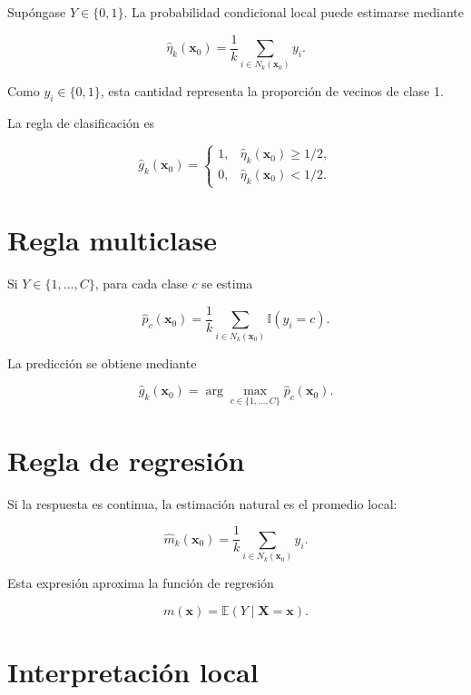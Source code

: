 \documentclass[
  spanish,
  10.5pt,
  letterpaper,
  DIV=11,
  numbers=noendperiod,
  oneside,
  open=any]{scrreprt}
\theoremstyle{definition}
\theoremstyle{definition}
\theoremstyle{plain}
\theoremstyle{remark}
\begin{document}

Supóngase \(Y\in\{0,1\}\). La probabilidad condicional local puede
estimarse mediante

\[
\widehat{\eta}_k(\mathbf{x}_0)
=
\frac{1}{k}
\sum_{i\in N_k(\mathbf{x}_0)} y_i.
\]

Como \(y_i\in\{0,1\}\), esta cantidad representa la proporción de
vecinos de clase 1.

La regla de clasificación es

\[
\widehat{g}_k(\mathbf{x}_0)
=
\begin{cases}
1, & \widehat{\eta}_k(\mathbf{x}_0)\ge 1/2,\\
0, & \widehat{\eta}_k(\mathbf{x}_0)<1/2.
\end{cases}
\]

\section*{Regla multiclase}\label{regla-multiclase}


Si \(Y\in\{1,\ldots,C\}\), para cada clase \(c\) se estima

\[
\widehat{p}_c(\mathbf{x}_0)
=
\frac{1}{k}
\sum_{i\in N_k(\mathbf{x}_0)}
\mathbb{I}(y_i=c).
\]

La predicción se obtiene mediante

\[
\widehat{g}_k(\mathbf{x}_0)
=
\arg\max_{c\in\{1,\ldots,C\}}
\widehat{p}_c(\mathbf{x}_0).
\]

\section*{Regla de regresión}\label{regla-de-regresiuxf3n}


Si la respuesta es continua, la estimación natural es el promedio local:

\[
\widehat{m}_k(\mathbf{x}_0)
=
\frac{1}{k}
\sum_{i\in N_k(\mathbf{x}_0)} y_i.
\]

Esta expresión aproxima la función de regresión

\[
m(\mathbf{x})=\mathbb{E}(Y\mid\mathbf{X}=\mathbf{x}).
\]

\section*{Interpretación local}\label{interpretaciuxf3n-local}
\end{document}
